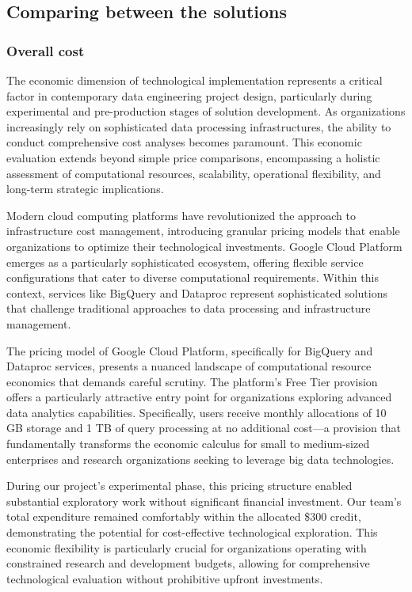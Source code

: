 \subsection{Comparing between the solutions}

\subsubsection{Overall cost}
The economic dimension of technological implementation represents a critical factor in contemporary
data engineering project design, particularly during experimental and pre-production stages of
solution development. As organizations increasingly rely on sophisticated data processing
infrastructures, the ability to conduct comprehensive cost analyses becomes paramount. This economic
evaluation extends beyond simple price comparisons, encompassing a holistic assessment of
computational resources, scalability, operational flexibility, and long-term strategic implications.

Modern cloud computing platforms have revolutionized the approach to infrastructure cost management,
introducing granular pricing models that enable organizations to optimize their technological
investments. Google Cloud Platform emerges as a particularly sophisticated ecosystem, offering
flexible service configurations that cater to diverse computational requirements. Within this
context, services like BigQuery and Dataproc represent sophisticated solutions that challenge
traditional approaches to data processing and infrastructure management.

The pricing model of Google Cloud Platform, specifically for BigQuery and Dataproc services,
presents a nuanced landscape of computational resource economics that demands careful scrutiny. The
platform's Free Tier provision offers a particularly attractive entry point for organizations
exploring advanced data analytics capabilities. Specifically, users receive monthly allocations of
10 GB storage and 1 TB of query processing at no additional cost—a provision that fundamentally
transforms the economic calculus for small to medium-sized enterprises and research organizations
seeking to leverage big data technologies.

During our project's experimental phase, this pricing structure enabled substantial exploratory work
without significant financial investment. Our team's total expenditure remained comfortably within
the allocated \$300 credit, demonstrating the potential for cost-effective technological exploration.
This economic flexibility is particularly crucial for organizations operating with constrained
research and development budgets, allowing for comprehensive technological evaluation without
prohibitive upfront investments.

